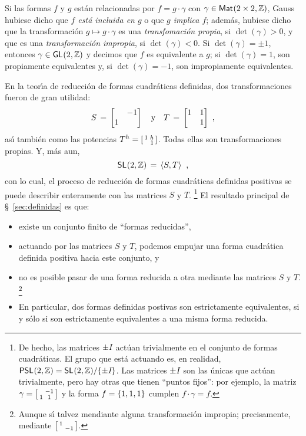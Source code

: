Si las formas $f$ y $g$ est\'an relacionadas por $f=g\cdot\gamma$
con $\gamma\in\mathsf{Mat}_{}(2\times 2,\mathbb{Z})$, Gauss hubiese dicho que
\emph{$f$ est\'a incluida en $g$} o que \emph{$g$ implica $f$};
adem\'as, hubiese dicho que la transformaci\'on $g\mapsto g\cdot\gamma$
es una \emph{transfomaci\'on propia}, si $\det(\gamma)>0$, y que
es una \emph{transformaci\'on impropia}, si $\det(\gamma)<0$.
\cite[\S~157]{Gauss}
Si $\det(\gamma)=\pm 1$, entonces $\gamma\in\mathsf{GL}_{}(2,\mathbb{Z})$ y
decimos que $f$ es equivalente a $g$; si $\det(\gamma)=1$, son
propiamente equivalentes y, si $\det(\gamma)=-1$, son impropiamente
equivalentes.

En la teor\'{\i}a de reducci\'on de formas cuadr\'aticas definidas,
dos transformaciones fueron de gran utilidad:
\begin{displaymath}
	S\,=\,\begin{bmatrix} & -1 \\ 1 & \end{bmatrix}\quad\text{y}\quad
	T\,=\,\begin{bmatrix} 1 & 1 \\ & 1 \end{bmatrix}
		\text{ ,}
\end{displaymath}
%
as\'{\i} tambi\'en como las potencias $T^h= \left[\begin{smallmatrix}  1 & h \\ & 1  \end{smallmatrix}\right]$.
Todas ellas son transformaciones propias. Y, m\'as aun,
\begin{displaymath}
	\mathsf{SL}_{}(2,\mathbb{Z})\,=\,\left\langle{S,T}\right\rangle_{}
	\text{ ,}
\end{displaymath}
%
con lo cual, el proceso de reducci\'on de formas cuadr\'aticas definidas
positivas se puede describir enteramente con las matrices $S$ y $T$.%
\footnote{
	De hecho, las matrices $\pm\mathit{I}_{}$ act\'uan trivialmente en el conjunto
	de formas cuadr\'aticas. El grupo que est\'a actuando es, en realidad,
	$\mathsf{PSL}_{}(2,\mathbb{Z})=\mathsf{SL}_{}(2,\mathbb{Z})/\{\pm\mathit{I}_{}\}$.
	Las matrices $\pm\mathit{I}_{}$ son las \'unicas que act\'uan trivialmente,
	pero hay otras que tienen ``puntos fijos'': por ejemplo,
	la matriz $\gamma= \left[\begin{smallmatrix}  & -1 \\ 1 & 1  \end{smallmatrix}\right]$ y la forma
	$f=\left\{1,1,1\right\}$ cumplen $f\cdot\gamma=f$.
}
El resultado principal de \S~\ref{sec:definidas} es que:
\begin{itemize}
	\item existe un conjunto finito de ``formas reducidas'',
	\item actuando por las matrices $S$ y $T$, podemos empujar
		una forma cuadr\'atica definida positiva hacia
		este conjunto, y
	\item no es posible pasar de una forma reducida a otra mediante
		las matrices $S$ y $T$.%
		\footnote{
			Aunque s\'{\i} talvez mendiante alguna
			transformaci\'on impropia; precisamente, mediante
			$ \left[\begin{smallmatrix}  1 & \\ & -1  \end{smallmatrix}\right]$.
		}
	\item En particular, dos formas definidas postivas son estrictamente
		equivalentes, si y s\'olo si son estrictamente equivalentes
		a una misma forma reducida.
\end{itemize}
%

